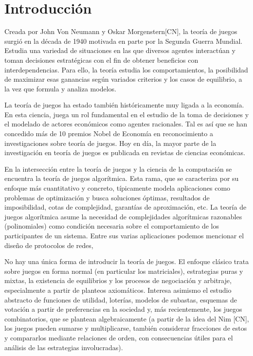 \chapter{Introducción} \label{cap:intro}

Creada por John Von Neumann y Oskar Morgenstern[CN], la teoría de juegos surgió en la década de 1940 motivada en parte por la Segunda Guerra Mundial. Estudia una variedad de situaciones en las que diversos agentes interactúan y toman decisiones estratégicas con el fin de obtener beneficios con interdependencias. Para ello, la teoría estudia los comportamientos, la posibilidad de maximizar esas ganancias según variados criterios y los casos de equilibrio, a la vez que formula y analiza modelos.

La teoría de juegos ha estado también históricamente muy ligada a la economía. En esta ciencia, juega un rol fundamental en el estudio de la toma de decisiones y el modelado de actores económicos como agentes racionales. Tal es así que se han concedido más de 10 premios Nobel de Economía en reconocimiento a investigaciones sobre teoría de juegos. Hoy en día, la mayor parte de la investigación en teoría de juegos es publicada en revistas de ciencias económicas.

En la intersección entre la teoría de juegos y la ciencia de la computación se encuentra la teoría de juegos algorítmica. Esta rama, que se caracteriza por su enfoque más cuantitativo y concreto, típicamente modela aplicaciones como problemas de optimización y busca soluciones óptimas, resultados de imposibilidad, cotas de complejidad, garantías de aproximación, etc. La teoría de juegos algorítmica asume la necesidad de complejidades algorítmicas razonables (polinomiales) como condición necesaria sobre el comportamiento de los participantes de un sistema. Entre sus varias aplicaciones podemos mencionar el diseño de protocolos de redes,   

No hay una única forma de introducir la teoría de juegos. El enfoque clásico trata sobre juegos en forma normal (en particular los matriciales), estrategias puras y mixtas, la existencia de equilibrios y los procesos de negociación y arbitraje, especialmente a partir de planteos axiomáticos. Interesa asimismo el estudio abstracto de funciones de utilidad, loterías, modelos de subastas, esquemas de votación a partir de preferencias en la sociedad y, más recientemente, los juegos combinatorios, que se plantean algebraicamente (a partir de la idea del Nim [CN], los juegos pueden sumarse y multiplicarse, también considerar fracciones de estos y compararlos mediante relaciones de orden, con consecuencias útiles para el análisis de las estrategias involucradas).

